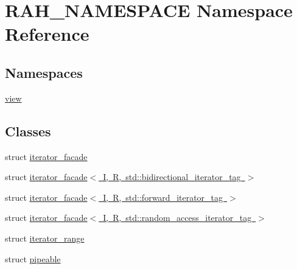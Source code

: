 \hypertarget{namespace_r_a_h___n_a_m_e_s_p_a_c_e}{}\section{R\+A\+H\+\_\+\+N\+A\+M\+E\+S\+P\+A\+CE Namespace Reference}
\label{namespace_r_a_h___n_a_m_e_s_p_a_c_e}
\subsection*{Namespaces}
\begin{DoxyCompactItemize}
\item 
 \mbox{\hyperlink{namespace_r_a_h___n_a_m_e_s_p_a_c_e_1_1view}{view}}
\end{DoxyCompactItemize}
\subsection*{Classes}
\begin{DoxyCompactItemize}
\item 
struct \mbox{\hyperlink{struct_r_a_h___n_a_m_e_s_p_a_c_e_1_1iterator__facade}{iterator\+\_\+facade}}
\item 
struct \mbox{\hyperlink{struct_r_a_h___n_a_m_e_s_p_a_c_e_1_1iterator__facade_3_01_i_00_01_r_00_01std_1_1bidirectional__iterator__tag_01_4}{iterator\+\_\+facade$<$ I, R, std\+::bidirectional\+\_\+iterator\+\_\+tag $>$}}
\item 
struct \mbox{\hyperlink{struct_r_a_h___n_a_m_e_s_p_a_c_e_1_1iterator__facade_3_01_i_00_01_r_00_01std_1_1forward__iterator__tag_01_4}{iterator\+\_\+facade$<$ I, R, std\+::forward\+\_\+iterator\+\_\+tag $>$}}
\item 
struct \mbox{\hyperlink{struct_r_a_h___n_a_m_e_s_p_a_c_e_1_1iterator__facade_3_01_i_00_01_r_00_01std_1_1random__access__iterator__tag_01_4}{iterator\+\_\+facade$<$ I, R, std\+::random\+\_\+access\+\_\+iterator\+\_\+tag $>$}}
\item 
struct \mbox{\hyperlink{struct_r_a_h___n_a_m_e_s_p_a_c_e_1_1iterator__range}{iterator\+\_\+range}}
\item 
struct \mbox{\hyperlink{struct_r_a_h___n_a_m_e_s_p_a_c_e_1_1pipeable}{pipeable}}
\end{DoxyCompactItemize}
